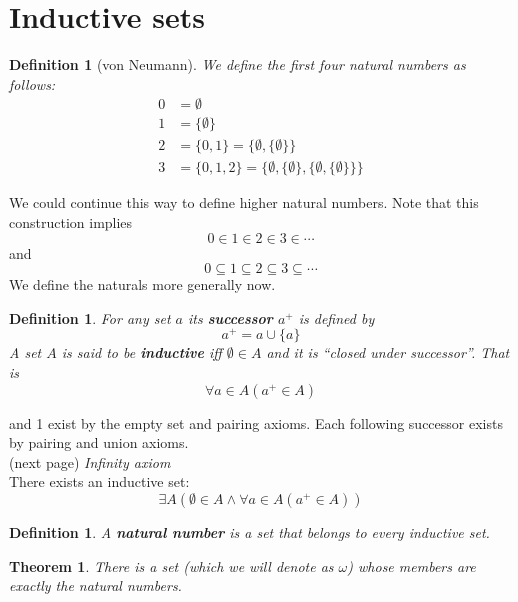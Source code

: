 \documentclass{report}
\newtheorem{theorem}[theo]{Theorem}
\newtheorem{definition}[theo]{Definition}
\begin{document}
\section{Inductive sets}
\begin{definition}[von Neumann]
We define the first four natural numbers as follows:
\begin{align*}
0&=\emptyset\\
1&=\{\emptyset\}\\
2&=\{0,1\}=\{\emptyset,\{\emptyset\}\}\\
3&=\{0,1,2\}=\{\emptyset,\{\emptyset\},\{\emptyset,\{\emptyset\}\}\}
\end{align*}
\end{definition}
\noindent We could continue this way to define higher natural numbers. Note that this construction implies
\begin{equation*}
0\in1\in2\in3\in\cdots
\end{equation*}
and
\begin{equation*}
0\subseteq1\subseteq2\subseteq3\subseteq\cdots
\end{equation*}
We define the naturals more generally now.
\begin{definition}
For any set $a$ its \textbf{successor} $a^+$ is defined by
\begin{equation*}
a^+=a\cup\{a\}
\end{equation*}
A set $A$ is said to be \textbf{inductive} iff $\emptyset\in A$ and it is ``closed under successor''. That is
\begin{equation*}
\forall a\in A(a^+\in A)
\end{equation*}
\end{definition}
 and 1 exist by the empty set and pairing axioms. Each following successor exists by pairing and union axioms.\\
(next page)\newpage
\noindent\textit{Infinity axiom}\\
There exists an inductive set:
\begin{equation*}
\exists A(\emptyset\in A\land\forall a\in A(a^+\in A))
\end{equation*}
\begin{definition}
A \textbf{natural number} is a set that belongs to every inductive set.
\end{definition}
\begin{theorem}
There is a set (which we will denote as $\omega$) whose members are exactly the natural numbers.
\end{theorem}
\end{document}
